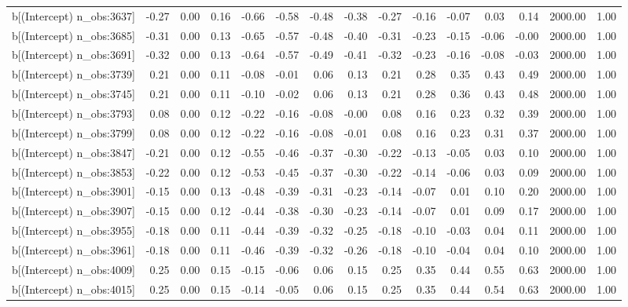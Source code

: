 \begin{table}[ht]
\begin{tabular}{rrrrrrrrrrrrrrr}
  b[(Intercept) n\_obs:3637] & -0.27 & 0.00 & 0.16 & -0.66 & -0.58 & -0.48 & -0.38 & -0.27 & -0.16 & -0.07 & 0.03 & 0.14 & 2000.00 & 1.00 \\ 
  b[(Intercept) n\_obs:3685] & -0.31 & 0.00 & 0.13 & -0.65 & -0.57 & -0.48 & -0.40 & -0.31 & -0.23 & -0.15 & -0.06 & -0.00 & 2000.00 & 1.00 \\ 
  b[(Intercept) n\_obs:3691] & -0.32 & 0.00 & 0.13 & -0.64 & -0.57 & -0.49 & -0.41 & -0.32 & -0.23 & -0.16 & -0.08 & -0.03 & 2000.00 & 1.00 \\ 
  b[(Intercept) n\_obs:3739] & 0.21 & 0.00 & 0.11 & -0.08 & -0.01 & 0.06 & 0.13 & 0.21 & 0.28 & 0.35 & 0.43 & 0.49 & 2000.00 & 1.00 \\ 
  b[(Intercept) n\_obs:3745] & 0.21 & 0.00 & 0.11 & -0.10 & -0.02 & 0.06 & 0.13 & 0.21 & 0.28 & 0.36 & 0.43 & 0.48 & 2000.00 & 1.00 \\ 
  b[(Intercept) n\_obs:3793] & 0.08 & 0.00 & 0.12 & -0.22 & -0.16 & -0.08 & -0.00 & 0.08 & 0.16 & 0.23 & 0.32 & 0.39 & 2000.00 & 1.00 \\ 
  b[(Intercept) n\_obs:3799] & 0.08 & 0.00 & 0.12 & -0.22 & -0.16 & -0.08 & -0.01 & 0.08 & 0.16 & 0.23 & 0.31 & 0.37 & 2000.00 & 1.00 \\ 
  b[(Intercept) n\_obs:3847] & -0.21 & 0.00 & 0.12 & -0.55 & -0.46 & -0.37 & -0.30 & -0.22 & -0.13 & -0.05 & 0.03 & 0.10 & 2000.00 & 1.00 \\ 
  b[(Intercept) n\_obs:3853] & -0.22 & 0.00 & 0.12 & -0.53 & -0.45 & -0.37 & -0.30 & -0.22 & -0.14 & -0.06 & 0.03 & 0.09 & 2000.00 & 1.00 \\ 
  b[(Intercept) n\_obs:3901] & -0.15 & 0.00 & 0.13 & -0.48 & -0.39 & -0.31 & -0.23 & -0.14 & -0.07 & 0.01 & 0.10 & 0.20 & 2000.00 & 1.00 \\ 
  b[(Intercept) n\_obs:3907] & -0.15 & 0.00 & 0.12 & -0.44 & -0.38 & -0.30 & -0.23 & -0.14 & -0.07 & 0.01 & 0.09 & 0.17 & 2000.00 & 1.00 \\ 
  b[(Intercept) n\_obs:3955] & -0.18 & 0.00 & 0.11 & -0.44 & -0.39 & -0.32 & -0.25 & -0.18 & -0.10 & -0.03 & 0.04 & 0.11 & 2000.00 & 1.00 \\ 
  b[(Intercept) n\_obs:3961] & -0.18 & 0.00 & 0.11 & -0.46 & -0.39 & -0.32 & -0.26 & -0.18 & -0.10 & -0.04 & 0.04 & 0.10 & 2000.00 & 1.00 \\ 
  b[(Intercept) n\_obs:4009] & 0.25 & 0.00 & 0.15 & -0.15 & -0.06 & 0.06 & 0.15 & 0.25 & 0.35 & 0.44 & 0.55 & 0.63 & 2000.00 & 1.00 \\ 
  b[(Intercept) n\_obs:4015] & 0.25 & 0.00 & 0.15 & -0.14 & -0.05 & 0.06 & 0.15 & 0.25 & 0.35 & 0.44 & 0.54 & 0.63 & 2000.00 & 1.00 \\ 

\end{tabular}
\end{table}
